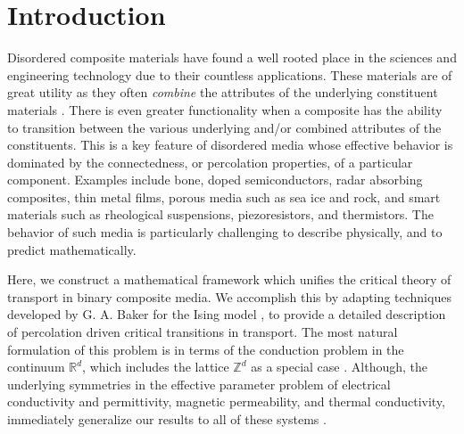 \documentclass[english,12pt,jmp,graphicx]{revtex4-1}
\begin{document}

\maketitle %

%
\section{Introduction}\label{sec:Introduction}
%
Disordered composite materials have found a well rooted place in the
sciences and engineering technology due to their countless
applications. These materials are of great utility as they often
\emph{combine} the attributes of the underlying constituent materials
\cite{MILTON:2002:TC}. There is even greater functionality when a
composite has the ability to transition between the various underlying
and/or combined attributes of the constituents. This is a key feature
of disordered media whose effective behavior is dominated by the
connectedness, or percolation properties, of a particular
component. Examples include bone, doped semiconductors, radar
absorbing composites, thin metal films, porous media such as sea ice
and rock, and smart materials such as rheological suspensions,
piezoresistors, and thermistors. The behavior of such media is
particularly  challenging to describe physically, and to predict
mathematically. 

Here, we construct a mathematical framework which unifies the critical
theory of transport in binary composite media. We accomplish this by
adapting techniques developed by G. A. Baker for the Ising model
\cite{Baker-1990}, to provide a detailed description of percolation
driven critical transitions in transport. The most natural formulation
of this problem is in terms  of the conduction problem in the
continuum $\mathbb{R}^d$, which includes the lattice $\mathbb{Z}^d$ as
a special case \cite{Golden:JMP-5627,Golden:CMP-473}. Although, the
underlying symmetries in the effective parameter problem of electrical 
conductivity and permittivity, magnetic permeability, and thermal
conductivity, immediately generalize our results to all of these
systems \cite{MILTON:2002:TC}.   
\end{document}
